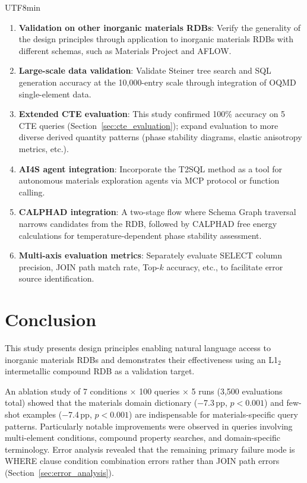 \documentclass[sn-mathphys,Numbered]{sn-jnl}
\begin{document}
\begin{CJK}{UTF8}{min}
\begin{enumerate}
  \item \textbf{Validation on other inorganic materials RDBs}:
    Verify the generality of the design principles through
    application to inorganic materials RDBs with different schemas,
    such as Materials Project and AFLOW.
  \item \textbf{Large-scale data validation}:
    Validate Steiner tree search and SQL generation accuracy at
    the 10{,}000-entry scale through integration of OQMD
    single-element data.
  \item \textbf{Extended CTE evaluation}:
    This study confirmed 100\% accuracy on 5 CTE queries
    (Section~\ref{sec:cte_evaluation}); expand evaluation to more
    diverse derived quantity patterns (phase stability diagrams,
    elastic anisotropy metrics, etc.).
  \item \textbf{AI4S agent integration}:
    Incorporate the T2SQL method as a tool for autonomous materials
    exploration agents via MCP protocol or function calling.
  \item \textbf{CALPHAD integration}:
    A two-stage flow where Schema Graph traversal narrows
    candidates from the RDB, followed by CALPHAD free energy
    calculations for temperature-dependent phase stability
    assessment.
  \item \textbf{Multi-axis evaluation metrics}:
    Separately evaluate SELECT column precision, JOIN path match
    rate, Top-$k$ accuracy, etc., to facilitate error source
    identification.
\end{enumerate}

\section{Conclusion}
\label{sec:conclusion}

This study presents design principles enabling natural language
access to inorganic materials RDBs and demonstrates their
effectiveness using an L1$_2$ intermetallic compound RDB as a
validation target.

An ablation study of 7 conditions $\times$ 100 queries $\times$
5 runs (3{,}500 evaluations total) showed that the materials
domain dictionary ($-$7.3\,pp, $p<0.001$) and few-shot examples
($-$7.4\,pp, $p<0.001$) are indispensable for materials-specific
query patterns.
Particularly notable improvements were observed in queries
involving multi-element conditions, compound property searches,
and domain-specific terminology.
Error analysis revealed that the remaining primary failure mode
is WHERE clause condition combination errors rather than JOIN path
errors (Section~\ref{sec:error_analysis}).


\end{CJK}
\end{document}
